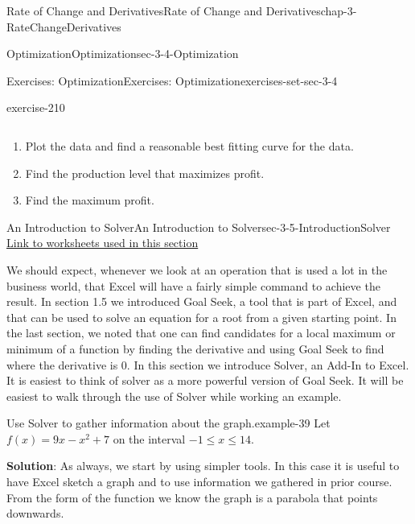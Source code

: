 \documentclass[oneside,10pt,]{book}
\newcommand{\terminology}[1]{\textbf{#1}}
\numberwithin{equation}{section}
\begin{document}
\begin{chapterptx}{Rate of Change and Derivatives}{}{Rate of Change and Derivatives}{}{}{chap-3-RateChangeDerivatives}
\begin{sectionptx}{Optimization}{}{Optimization}{}{}{sec-3-4-Optimization}
\begin{exercises-subsection-numberless}{Exercises: Optimization}{}{Exercises: Optimization}{}{}{exercises-set-sec-3-4}
\begin{divisionexercise}{20}{}{}{exercise-210}
\begin{sidebyside}{1}{0}{0}{0}
\begin{sbspanel}{1}
{\begin{tabular}{cccccc}
\end{tabular}
\par}
\end{sbspanel}%
\end{sidebyside}%
\leavevmode%
\begin{enumerate}[label=(\alph*)]
\item\hypertarget{li-418}{}\hypertarget{p-1323}{}%
Plot the data and find a reasonable best fitting curve for the data.%
\item\hypertarget{li-419}{}\hypertarget{p-1324}{}%
Find the production level that maximizes profit.%
\item\hypertarget{li-420}{}\hypertarget{p-1325}{}%
Find the maximum profit.%
\end{enumerate}
\end{divisionexercise}%
\end{exercises-subsection-numberless}
\end{sectionptx}
%
%
\typeout{************************************************}
\typeout{************************************************}
%
\begin{sectionptx}{An Introduction to Solver}{}{An Introduction to Solver}{}{}{sec-3-5-IntroductionSolver}
\hypertarget{p-1326}{}%
\href{./Examples/Section-3-5-Examples.xlsx}{Link to worksheets used in this section}%
\par
\hypertarget{p-1327}{}%
We should expect, whenever we look at an operation that is used a lot in the business world, that Excel will have a fairly simple command to achieve the result.  In section 1.5 we introduced Goal Seek, a tool that is part of Excel, and that can be used to solve an equation for a root from a given starting point.  In the last section, we noted that one can find candidates for a local maximum or minimum of a function by finding the derivative and using Goal Seek to find where the derivative is 0.  In this section we introduce Solver, an Add-In to Excel.  It is easiest to think of solver as a more powerful version of Goal Seek.  It will be easiest to walk through the use of Solver while working an example.%
\begin{example}{Use Solver to gather information about the graph.}{example-39}%
\hypertarget{p-1328}{}%
Let \(f(x)=9 x-x^2+7\) on the interval \(-1\le x \le 14\).%
\par
\hypertarget{p-1329}{}%
\terminology{Solution}:  As always, we start by using simpler tools.  In this case it is useful to have Excel sketch a graph and to use information we gathered in prior course.  From the form of the function we know the graph is a parabola that points downwards.%

\end{example}
\end{sectionptx}
\end{chapterptx}
\end{document}
